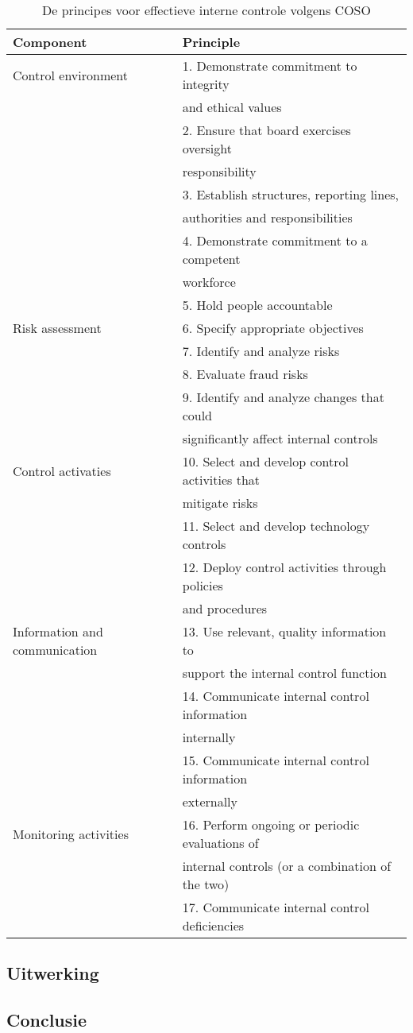 \begin{table}[h!]
    \centering
    \caption{De principes voor effectieve interne controle volgens COSO}
    \begin{tabular}{l l}
        \toprule
        \textbf{Component} & \textbf{Principle} \\
        \midrule
        Control environment & 1. Demonstrate commitment to integrity \\
         & and ethical values \\
         & 2. Ensure that board exercises oversight \\
         & responsibility \\
         & 3. Establish structures, reporting lines, \\
         & authorities and responsibilities \\
         & 4. Demonstrate commitment to a competent \\
         & workforce \\
         & 5. Hold people accountable \medskip \\
        Risk assessment & 6. Specify appropriate objectives \\
         & 7. Identify and analyze risks \\
         & 8. Evaluate fraud risks \\
         & 9. Identify and analyze changes that could \\
         & significantly affect internal controls \medskip \\
        Control activaties & 10. Select and develop control activities that \\
         & mitigate risks \\
         & 11. Select and develop technology controls \\
         & 12. Deploy control activities through policies \\
         & and procedures \medskip \\
        Information and communication & 13. Use relevant, quality information to \\
         & support the internal control function \\
         & 14. Communicate internal control information \\
         & internally \\
         & 15. Communicate internal control information \\
         & externally \medskip \\
        Monitoring activities & 16. Perform ongoing or periodic evaluations of \\
         & internal controls (or a combination of the two) \\
         & 17. Communicate internal control deficiencies \\
        \bottomrule
    \end{tabular}
    \label{tab:cosoprincipes}
\end{table}

\subsection{Uitwerking}


\subsection{Conclusie}